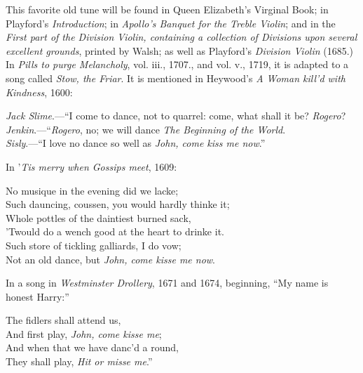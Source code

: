 
This favorite old tune will be found in Queen Elizabeth’s Virginal Book; in
Playford’s \textit{Introduction}; in \textit{Apollo’s Banquet for the Treble Violin}; and in the
\textit{First part of the Division Violin, containing a collection of Divisions upon several
excellent grounds}, printed by Walsh; as well as Playford’s \textit{Division Violin} (1685.)
In \textit{Pills to purge Melancholy}, vol. iii., 1707., and vol. v., 1719, it is adapted to a
song called \textit{Stow, the Friar}. It is mentioned in Heywood’s \textit{A Woman kill’d with
Kindness}, 1600:
\begin{scverse}
\textit{Jack Slime}.—“I come to dance, not to quarrel: come, what shall it be? \textit{Rogero}?\\
\textit{Jenkin}.—“\textit{Rogero}, no; we will dance \textit{The Beginning of the World}.\\
\textit{Sisly}.—“I love no dance so well as \textit{John, come kiss me now}.”
\end{scverse}
In ’\textit{Tis merry when Gossips meet}, 1609:
\settowidth{\versewidth}{Such dauncing, coussen, you would hardly thinke it;}
\begin{scverse}
No musique in the evening did we lacke;\\
Such dauncing, coussen, you would hardly thinke it;\\
Whole pottles of the daintiest burned sack,\\
’Twould do a wench good at the heart to drinke it.\\
Such store of tickling galliards, I do vow;\\
Not an old dance, but \textit{John, come kisse me now}.
\end{scverse}
In a song in \textit{Westminster Drollery}, 1671 and 1674, beginning, “My name is
honest Harry:”
\settowidth{\versewidth}{And when that we have danc’d a round,}
\begin{scverse}
The fidlers shall attend us,\\
And first play, \textit{John, come kisse me};\\
And when that we have danc’d a round,\\
They shall play, \textit{Hit or misse me}.”
\end{scverse}

